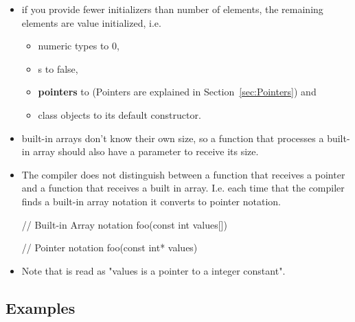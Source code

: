 \begin{itemize}
    \item if you provide fewer initializers than number of elements, the remaining elements are value initialized, i.e.
    \begin{itemize}
        \item numeric types to $0$, 
        \item {}s to false,
        \item \textbf{pointers} to  (Pointers are explained in Section~\ref{sec:Pointers}) and 
        \item class objects to its default constructor.
    \end{itemize}

    \item built-in arrays don't know their own size, so a function that processes a built-in array should also have a parameter to receive its size.

    \item The compiler does not distinguish between a function that receives a pointer and a function that receives a built in array. I.e. each time that the compiler finds a built-in array notation it converts to pointer  notation.\\
    \begin{minipage}{\MPWxXXSxLISTING\textwidth} %
{} %
        \begin{CPPCode}
// Built-in Array notation
foo(const int values[])
        \end{CPPCode}
    \end{minipage}
    \begin{minipage}{\MPWxXSxLISTING\textwidth} %
        \begin{CPPCode}
// Pointer notation
foo(const int* values)
        \end{CPPCode}
\end{minipage}
    \item Note that  is read as "values is a pointer to a integer constant".
\end{itemize}

\subsection{Examples}

